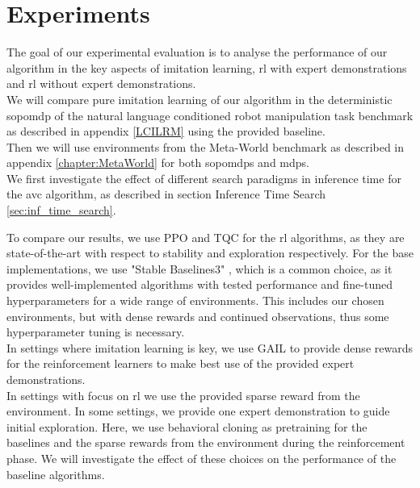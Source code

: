 
\chapter{Experiments}
\label{chapter:Experiments}
The goal of our experimental evaluation is to analyse the performance of our algorithm in the key aspects of 
imitation learning, \ac{rl} with expert demonstrations and \ac{rl} without expert demonstrations. \\

We will compare pure imitation learning of our algorithm in the deterministic \ac{sopomdp} of the 
natural language conditioned robot manipulation task benchmark as described in appendix \ref{LCILRM} using the provided baseline.\\

Then we will use environments from the Meta-World benchmark as described in appendix \ref{chapter:MetaWorld} for both \ac{sopomdp}s and \ac{mdp}s.\\

We first investigate the effect of different search paradigms in inference time for the \ac{avc} algorithm, as described in section Inference Time Search \ref{sec:inf_time_search}.

To compare our results, we use PPO and TQC for the \ac{rl} algorithms, as they are state-of-the-art with respect to stability and 
exploration respectively. For the base implementations, we use "Stable Baselines3" \cite{stable-baselines3}, which is a common choice, as it provides well-implemented algorithms with tested
performance and fine-tuned hyperparameters for a wide range of environments. This includes our chosen environments, but with dense rewards and continued observations,
thus some hyperparameter tuning is necessary.\\

In settings where imitation learning is key, we use GAIL to provide dense rewards for the reinforcement learners to make best use of the provided expert demonstrations. \\

In settings with focus on \ac{rl} we use the provided sparse reward from the environment. In some settings, we provide one 
expert demonstration to guide initial exploration. Here, we use behavioral cloning as pretraining for the baselines and the sparse rewards from the environment during the reinforcement phase. 
We will investigate the effect of these choices on the performance of the baseline algorithms.\\

